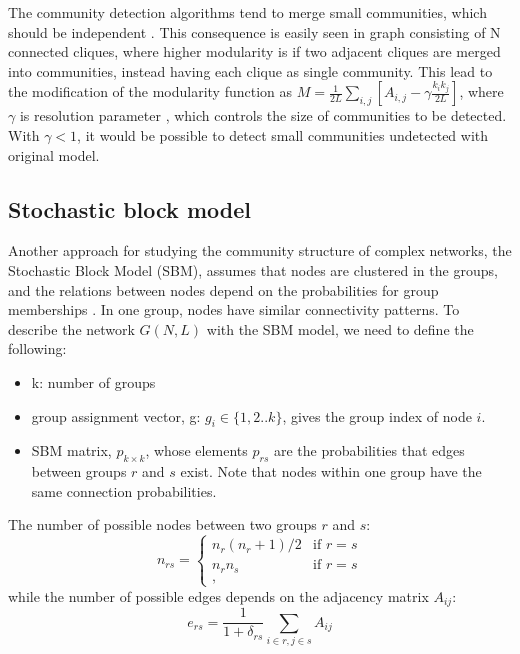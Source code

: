 The community detection algorithms tend to merge small communities, which should be independent \cite{fortunato2007resolution}. This consequence is easily seen in graph consisting of N connected cliques, where higher modularity is if two adjacent cliques are merged into communities, instead having each clique as single community. This lead to the modification of the modularity function as $M= \frac{1}{2L}\sum_{i,j}[A_{i,j} - \gamma \frac{k_ik_j}{2L}]$, where $\gamma$ is resolution parameter \cite{reichardt2006statistical}, which controls the size of communities to be detected. With $\gamma<1$, it would be possible to detect small communities undetected with original model. 




\subsection{Stochastic block model}

Another approach for studying the community structure of complex networks, the Stochastic Block Model (SBM), assumes that nodes are clustered in the groups, and the relations between nodes depend on the probabilities for group memberships \cite{lee2019review}. In one group, nodes have similar connectivity patterns. To describe the network $G(N, L)$ with the SBM model, we need to define the following:

\begin{itemize}
	\item k: number of groups
	\item group assignment vector, g: $g_i \in\{1,2..k\}$, gives the group index of node $i$.
	\item SBM matrix, $p_{k \times k}$, whose elements $p_{rs}$ are the probabilities that edges between groups $r$ and $s$ exist. Note that nodes within one group have the same connection probabilities. 
\end{itemize}

The number of possible nodes between two groups $r$ and $s$:
\begin{equation}
n_{rs} = \begin{cases}
n_r(n_{r}+1)/2 &\text{if  } r=s \\
n_rn_s &\text{if  } r=s\\, 
\end{cases}
\end{equation}
while the number of possible edges depends on the adjacency matrix $A_{ij}$:
\begin{equation}
e_{rs}=\frac{1}{1+\delta_{rs}}\sum_{i \in r, j\in s} A_{ij}
\end{equation}



